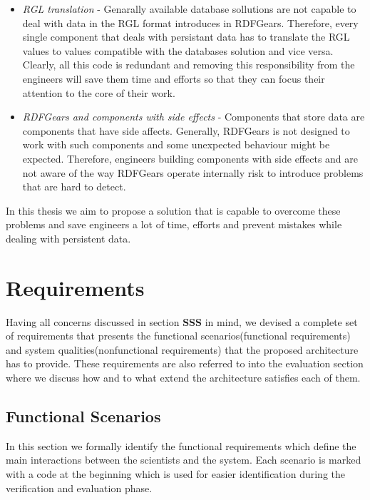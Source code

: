 \documentclass[a4paper, notitlepage]{article}
\begin{document}
\begin{itemize}
	\item \textit{RGL translation} - Genarally available database sollutions are not capable to deal with data in the RGL format introduces in RDFGears. Therefore, every single component that deals with persistant data has to translate the RGL values to values compatible with the databases solution and vice versa. Clearly, all this code is redundant and removing this responsibility from the engineers will save them time and efforts so that they can focus their attention to the core of their work.
	
	\item \textit{RDFGears and components with side effects} - Components that store data are components that have side affects. Generally, RDFGears is not designed to work with such components and some unexpected behaviour might be expected. Therefore, engineers building components with side effects and are not aware of the way RDFGears operate internally risk to introduce problems that are hard to detect.
	
\end{itemize}

In this thesis we aim to propose a solution that is capable to overcome these problems and save engineers a lot of time, efforts and prevent mistakes while dealing with persistent data.

\section{Requirements}

Having all concerns discussed in section \textbf{SSS} in mind, we devised a complete set of requirements that presents the functional scenarios(functional requirements) and system qualities(nonfunctional requirements) that the proposed architecture has to provide. These requirements are also referred to into the evaluation section where we discuss how and to what extend the architecture satisfies each of them.

\subsection{Functional Scenarios}
In this section we formally identify the functional requirements which define the main interactions between the scientists and the system. Each scenario is marked with a code at the beginning which is used for easier identification during the verification and evaluation phase.
\end{document}
